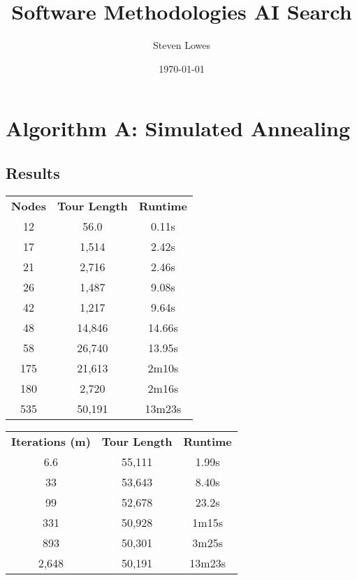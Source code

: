 \documentclass[a4paper, 11pt,table]{article}
\author{Steven Lowes}
\title{Software Methodologies AI Search}
\date{\today{}}
\begin{document}
	\section{Algorithm A: Simulated Annealing}
	
	\subsection{Results}
	\label{useCase:annealResults}
	\begin{center}
		\begin{tabu}{|c c c|}
			\textbf{Nodes} & \textbf{Tour Length} & \textbf{Runtime}\\
			12 & 56.0 & 0.11s \\
			17 & 1,514 & 2.42s\\
			21 & 2,716 & 2.46s\\
			26 & 1,487 & 9.08s\\
			42 & 1,217 & 9.64s\\
			48 & 14,846 & 14.66s\\
			58 & 26,740 & 13.95s\\
			175 & 21,613 & 2m10s\\
			180 & 2,720 & 2m16s\\
			535 & 50,191 & 13m23s\\
		\end{tabu}
	\end{center}

	\begin{center}
		\begin{tabu}{|c c c|}
			\textbf{Iterations (m)} & \textbf{Tour Length} & \textbf{Runtime}\\
			6.6 & 55,111 & 1.99s\\
			33 & 53,643 & 8.40s\\
			99 & 52,678 & 23.2s\\
			331 & 50,928 & 1m15s\\
			893 & 50,301 & 3m25s\\
			2,648 & 50,191 & 13m23s \\
		\end{tabu}
	\end{center}

	\begin{center}
	\end{center}
\end{document}
